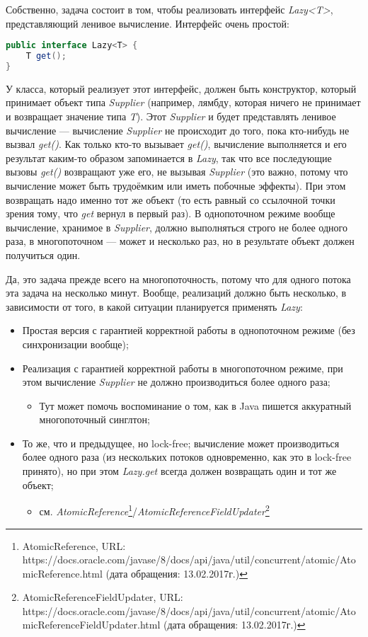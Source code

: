 \documentclass[a5paper]{article}
\begin{document}
Собственно, задача состоит в том, чтобы реализовать интерфейс \textit{Lazy<T>}, представляющий ленивое вычисление. Интерфейс очень простой:
\begin{lstlisting}[language=Java]
public interface Lazy<T> {
    T get();
}
\end{lstlisting}
У класса, который реализует этот интерфейс, должен быть конструктор, который принимает объект типа \textit{Supplier} (например, лямбду, которая ничего не принимает и возвращает значение типа \textit{T}). Этот \textit{Supplier} и будет представлять ленивое вычисление --- вычисление \textit{Supplier} не происходит до того, пока кто-нибудь не вызвал \textit{get()}. Как только кто-то вызывает \textit{get()}, вычисление выполняется и его результат каким-то образом запоминается в \textit{Lazy}, так что все последующие вызовы \textit{get()} возвращают уже его, не вызывая \textit{Supplier} (это важно, потому что вычисление может быть трудоёмким или иметь побочные эффекты). При этом возвращать надо именно тот же объект (то есть равный со ссылочной точки зрения тому, что \textit{get} вернул в первый раз). В однопоточном режиме вообще вычисление, хранимое в \textit{Supplier}, должно выполняться строго не более одного раза, в многопоточном --- может и несколько раз, но в результате объект должен получиться один.

Да, это задача прежде всего на многопоточность, потому что для одного потока эта задача на несколько минут. Вообще, реализаций должно быть несколько, в зависимости от того, в какой ситуации планируется применять \textit{Lazy}:
\begin{itemize}
	\item Простая версия с гарантией корректной работы в однопоточном режиме (без синхронизации вообще);
	\item Реализация с гарантией корректной работы в многопоточном режиме, при этом вычисление \textit{Supplier} не должно производиться более одного раза;
	\begin{itemize}
		\item Тут может помочь воспоминание о том, как в Java пишется аккуратный многопоточный синглтон;
	\end{itemize}
	\item То же, что и предыдущее, но lock-free; вычисление может производиться более одного
		раза (из нескольких потоков одновременно, как это в lock-free принято), но при этом \textit{Lazy.get} всегда должен возвращать один и тот же объект;
	\begin{itemize}
		\item см. \textit{AtomicReference}\footnote{\tiny{AtomicReference, URL: https://docs.oracle.com/javase/8/docs/api/java/util/concurrent/atomic/AtomicReference.html (дата обращения: 13.02.2017г.)}}/\textit{AtomicReferenceFieldUpdater}\footnote{\tiny{AtomicReferenceFieldUpdater, URL: https://docs.oracle.com/javase/8/docs/api/java/util/concurrent/atomic/AtomicReferenceFieldUpdater.html (дата обращения: 13.02.2017г.)}}
	\end{itemize}
\end{itemize}
\end{document}
